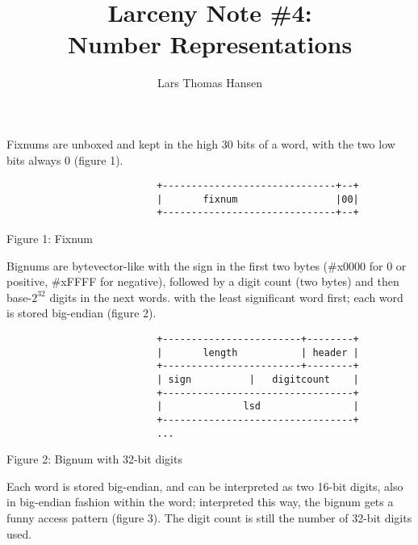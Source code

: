 


\title{Larceny Note \#4: \\
       Number Representations}
\author{Lars Thomas Hansen}


\maketitle

Fixnums are unboxed and kept in the high 30 bits of a word, with the
two low bits always 0 (figure 1).

\begin{minipage}{\linewidth}
\begin{verbatim}
                          +------------------------------+--+
                          |       fixnum                 |00|
                          +------------------------------+--+
\end{verbatim}
\centerline{Figure 1: Fixnum}
\end{minipage}

Bignums are bytevector-like with the sign in the first two bytes
(\#x0000 for 0 or positive, \#xFFFF for negative), followed by a digit
count (two bytes) and then base-$2^{32}$ digits in the next words.
with the least significant word first; each word is stored big-endian
(figure 2).

\begin{minipage}{\linewidth}
\begin{verbatim}
                          +------------------------+--------+
                          |       length           | header |
                          +------------------------+--------+
                          | sign          |   digitcount    |
                          +---------------------------------+
                          |              lsd                |
                          +---------------------------------+
                          ...
\end{verbatim}
\centerline{Figure 2: Bignum with 32-bit digits}
\end{minipage}

Each word is stored big-endian, and can be interpreted as two 16-bit
digits, also in big-endian fashion within the word; interpreted this
way, the bignum gets a funny access pattern (figure 3).
The digit count is still the number of 32-bit digits used.

